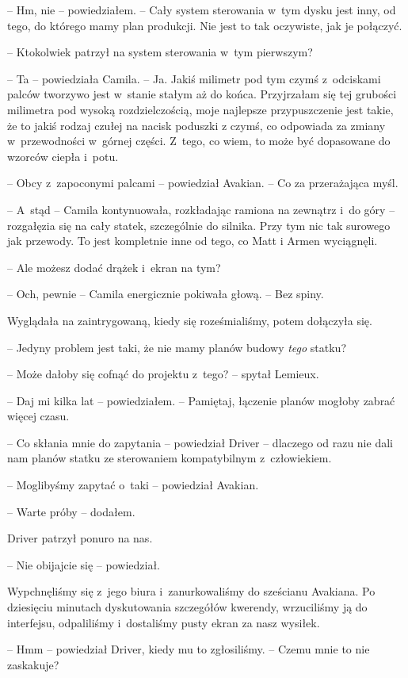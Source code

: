 \documentclass[oneside,polish,12pt,sfheadings]{mwbk}
\begin{document}
-- Hm, nie -- powiedziałem. -- Cały system sterowania w~tym dysku jest
inny, od tego, do którego mamy plan produkcji. Nie jest to tak
oczywiste, jak je połączyć.

-- Ktokolwiek patrzył na system sterowania w~tym pierwszym?

-- Ta -- powiedziała Camila. -- Ja. Jakiś milimetr pod tym czymś z~odciskami palców tworzywo jest w~stanie stałym aż do końca. Przyjrzałam
się tej grubości milimetra pod wysoką rozdzielczością, moje najlepsze
przypuszczenie jest takie, że to jakiś rodzaj czułej na nacisk poduszki
z czymś, co odpowiada za zmiany w~przewodności w~górnej części. Z~tego,
co wiem, to może być dopasowane do wzorców ciepła i~potu.

-- Obcy z~zapoconymi palcami -- powiedział Avakian. -- Co za przerażająca
myśl.

-- A~stąd -- Camila kontynuowała, rozkładając ramiona na zewnątrz i~do
góry -- rozgałęzia się na cały statek, szczególnie do silnika. Przy tym
nic tak surowego jak przewody. To jest kompletnie inne od tego, co Matt
i Armen wyciągnęli.

-- Ale możesz dodać drążek i~ekran na tym?

-- Och, pewnie -- Camila energicznie pokiwała głową. -- Bez spiny.

Wyglądała na zaintrygowaną, kiedy się roześmialiśmy, potem dołączyła
się.

-- Jedyny problem jest taki, że nie mamy planów budowy \emph{tego
}statku?

-- Może dałoby się cofnąć do projektu z~tego? -- spytał Lemieux.

-- Daj mi kilka lat -- powiedziałem. -- Pamiętaj, łączenie planów mogłoby
zabrać więcej czasu.

-- Co skłania mnie do zapytania -- powiedział Driver -- dlaczego od razu
nie dali nam planów statku ze sterowaniem kompatybilnym z~człowiekiem.

-- Moglibyśmy zapytać o~taki -- powiedział Avakian.

-- Warte próby -- dodałem.

Driver patrzył ponuro na nas.

-- Nie obijajcie się -- powiedział.

Wypchnęliśmy się z~jego biura i~zanurkowaliśmy do sześcianu Avakiana. Po
dziesięciu minutach dyskutowania szczegółów kwerendy, wrzuciliśmy ją do
interfejsu, odpaliliśmy i~dostaliśmy pusty ekran za nasz wysiłek.

-- Hmm -- powiedział Driver, kiedy mu to zgłosiliśmy. -- Czemu mnie to nie
zaskakuje?
\end{document}
